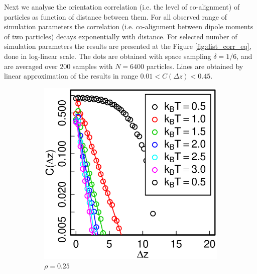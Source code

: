 Next we analyse the orientation correlation (i.e. the level of co-alignment) of particles as function of distance between them. For all observed range of simulation parameters the correlation (i.e. co-alignment between dipole moments of two particles) decays exponentially with distance. For selected number of simulation parameters the results are presented at the Figure \ref{fig:dist_corr_eq}, done in log-linear scale. The dots are obtained with space sampling $\delta = 1/6$, and are averaged over $200$ samples with $N = 6400$ particles. Lines are obtained by linear approximation of the results in range $0.01 < C(\Delta z) < 0.45$.
\begin{figure}[h]
\centering
\begin{subfigure}[t]{0.32\textwidth}
	\centering
	\includegraphics[width=\textwidth]{Images/distCor_25}
	\caption{$\rho = 0.25$}
\end{subfigure}
\begin{subfigure}[t]{0.32\textwidth}
	\centering

\end{subfigure}
\end{figure}
